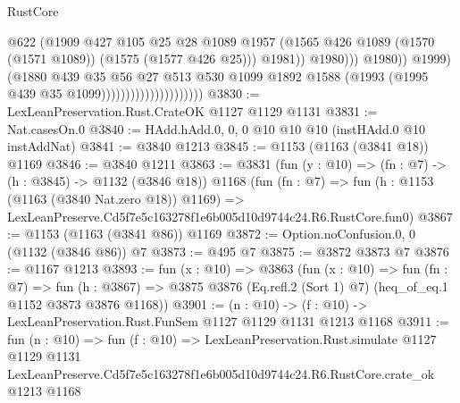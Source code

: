 \begin{lexlean}{RustCore}
\begin{coremodule}
                                                      @622
                                                      (@1909
                                                        @427
                                                        @105
                                                        @25
                                                        @28
                                                        @1089
                                                        @1957
                                                        (@1565
                                                          @426
                                                          @1089
                                                          (@1570 (@1571 @1089))
                                                          (@1575 (@1577 @426 @25)))
                                                        @1981))
                                                    @1980)))
                                              @1980))
                                          @1999)
                                        (@1880
                                          @439
                                          @35
                                          @56
                                          @27
                                          @513
                                          @530
                                          @1099
                                          @1892
                                          @1588
                                          (@1993 (@1995 @439 @35 @1099)))))))))))))))))))))
@3830 := LexLeanPreservation.Rust.CrateOK @1127 @1129 @1131
@3831 := Nat.casesOn.{0}
@3840 := HAdd.hAdd.{0, 0, 0} @10 @10 @10 (instHAdd.{0} @10 instAddNat)
@3841 := @3840 @1213
@3845 := @1153 (@1163 (@3841 @18)) @1169
@3846 := @3840 @1211
@3863 := @3831
    (fun (y : @10) => (fn : @7) -> (h : @3845) -> @1132 (@3846 @18))
    @1168
    (fun (fn : @7) =>
    fun (h : @1153 (@1163 (@3840 Nat.zero @18)) @1169) =>
    LexLeanPreserve.Cd5f7e5c163278f1e6b005d10d9744c24.R6.RustCore.fun0)
@3867 := @1153 (@1163 (@3841 @86)) @1169
@3872 := Option.noConfusion.{0, 0} (@1132 (@3846 @86)) @7
@3873 := @495 @7
@3875 := @3872 @3873 @7
@3876 := @1167 @1213
@3893 := fun (x : @10) =>
  @3863
    (fun (x : @10) =>
    fun (fn : @7) =>
    fun (h : @3867) =>
    @3875 @3876 (Eq.refl.{2} (Sort 1) @7) (heq_of_eq.{1} @1152 @3873 @3876 @1168))
@3901 := (n : @10) -> (f : @10) -> LexLeanPreservation.Rust.FunSem @1127 @1129 @1131 @1213 @1168
@3911 := fun (n : @10) =>
  fun (f : @10) =>
  LexLeanPreservation.Rust.simulate
    @1127
    @1129
    @1131
    LexLeanPreserve.Cd5f7e5c163278f1e6b005d10d9744c24.R6.RustCore.crate_ok
    @1213
    @1168
\end{coremodule}
\end{lexlean}
